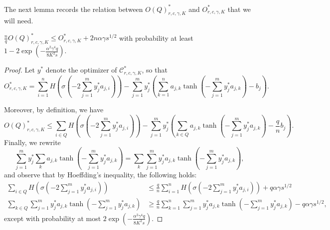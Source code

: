 \documentclass[final, 12pt]{colt2018}
\theoremstyle{definition}
\theoremstyle{plain}
\begin{document}
The next lemma records the relation between $O(Q)^*_{r,c,\gamma,K}$ and $O^*_{r,c,\gamma,K}$ that we will need.    
\begin{lemma}
\label{lemma:upper-bound-on-sample-dual}
$\frac{n}{q}O(Q)^{*}_{r,c,\gamma, K} \leq O^{*}_{r,c,\gamma, K} + 2n\alpha \gamma s^{1/2}$ with probability at least $1-2\exp\left(-\frac{\alpha^{2}\gamma^{4}q}{8K^2 s}\right)$. 
\end{lemma}
\begin{proof}
Let $y^{*}$ denote the optimizer of $\mathcal{C}^{*}_{r,c,\gamma,K}$, so that 
\[
O^{*}_{r,c,\gamma, K} =
\sum_{i=1}^{n}H\left(\sigma\left(-2\sum_{j=1}^{m}y^*_{j}a_{j,i}\right)\right)-\sum_{j=1}^{m}y^*_{j}\left(\sum_{k=1}^{n}a_{j,k}\tanh\left(-\sum_{j=1}^{m}y^*_{j}a_{j,k}\right)-b_{j}\right).
\]

Moreover, by definition, we have 
$$ O(Q)^{*}_{r,c,\gamma,K}\leq \sum_{i\in Q}H\left(\sigma\left(-2\sum_{j=1}^{m}y^*_{j}a_{j,i}\right)\right)-\sum_{j=1}^{m}y^*_{j}\left(\sum_{k\in Q}a_{j,k}\tanh\left(-\sum_{j=1}^{m}y^*_{j}a_{j,k}\right)-\frac{q}{n}b_{j}\right).$$ 
Finally, we rewrite 
\[
\sum_{j=1}^{m}y_{j}^{*}\sum_{k}a_{j,k}\tanh\left(-\sum_{j=1}^{m}y^*_{j}a_{j,k}\right)=\sum_{k}\sum_{j=1}^{m}y_{j}^{*}a_{j,k}\tanh\left(-\sum_{j=1}^{m}y^*_{j}a_{j,k}\right),
\]
and observe that by Hoeffding's inequality, the following holds:
\begin{align*}
\sum_{i\in Q}H\left(\sigma\left(-2\sum_{j=1}^{m}y_{j}^{*}a_{j,i}\right)\right) & \leq\frac{q}{n}\sum_{i=1}^{n}H\left(\sigma\left(-2\sum_{j=1}^{m}y_{j}^{*}a_{j,i}\right)\right)+ q\alpha\gamma s^{1/2}\\
\sum_{k\in Q}\sum_{j=1}^{m}y_{j}^{*}a_{j,k}\tanh\left(-\sum_{j=1}^{m}y^*_{j}a_{j,k}\right) & \geq\frac{q}{n}\sum_{k=1}^{n}\sum_{j=1}^{m}y_{j}^{*}a_{j,k}\tanh\left(-\sum_{j=1}^{m}y^*_{j}a_{j,k}\right)- q\alpha \gamma s^{1/2},
\end{align*}
except with probability at most $2\exp\left(-\frac{\alpha^{2}\gamma^{4}q}{8K^2 s}\right)$. 

\begin{comment}
and by the same remark as before, we can drop the conditions $0\leq x_{j}\leq1$.
This is also associated to an algorithm as above (recall that now,
we work instead with $\frac{d_{i}n}{q}$) returning a quantity $\log\overline{Z_{Q}}^{*}=\sum_{i=1}^{s}r_{Q,i}^{*}c_{Q,i}^{*}\frac{d_{i}n}{q}+H_{r_{Q}^{*},c_{Q}^{*}}$.
Our strategy will be to show that $\log Z^{*}$ is close to $\log\overline{Z}^{*}$,
$\log Z_{Q}^{*}$ is close to $\log\overline{Z_{Q}}^{*}$ and w.h.p.
$\log\overline{Z}^{*}$ is close to $\frac{n}{q}\log\overline{Z_{Q}}^{*}$.
Note that instead of thinking of $Q$ being a random subset of size
exactly $q$, it will be more convenient to think of $Q$ as being
generated by choosing $q$ independent uniform elements from $V$
with replacement. Since $q$ will ultimately be some constant depending
on $\epsilon$ whereas $|V|=n$, the probability of any element appearing
at least twice in $Q$ is $\frac{q^{2}}{n}$ so switching to this
version of $Q$ doesn't really make a difference. \\


\end{comment}
\end{proof}
\end{document}
